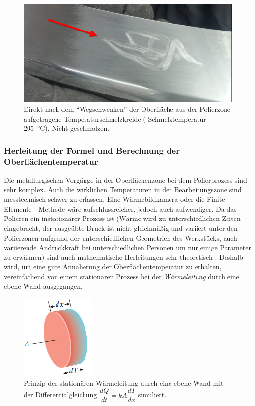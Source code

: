 \documentclass[12pt,a4paper,parskip,twoside,BCOR5mm,headsepline]{scrartcl}
\begin{document}
\begin{figure}[H]
\centering
\includegraphics[width=.8\textwidth]{Kreide}
\caption{Direkt nach dem "`Wegschwenken"' der Oberfläche aus der Polierzone aufgetragene Temperaturschmelzkreide ( Schmelztemperatur \SI{205}{\degreeCelsius}). Nicht geschmolzen.}
\label{kreide}
\end{figure}









\subsubsection{Herleitung der Formel und Berechnung der Oberflächentemperatur}
Die metallurgischen Vorgänge in der Oberflächenzone bei dem Polierprozess sind sehr komplex. Auch die wirklichen Temperaturen in der Bearbeitungszone sind messtechnisch schwer zu erfassen. Eine Wärmebildkamera oder die Finite - Elemente - Methode wäre aufschlussreicher, jedoch auch aufwendiger. Da das Polieren ein instationärer Prozess ist (Wärme wird zu unterschiedlichen Zeiten eingebracht, der ausgeübte Druck ist nicht gleichmäßig und variiert unter den Polierzonen aufgrund der unterschiedlichen Geometrien des Werkstücks, auch variierende Andruckkraft bei unterschiedlichen Personen um nur einige Parameter zu erwähnen) sind auch mathematische Herleitungen sehr theoretisch . Deshalb wird, um eine gute Annäherung der Oberflächentemperatur zu erhalten, vereinfachend von einem stationären Prozess bei der \emph{Wärmeleitung} durch eine ebene Wand ausgegangen.




\begin{figure}[H]
\centering
\includegraphics[width=.4\textwidth]{warmleittip}
\caption{Prinzip der stationären Wärmeleitung durch eine ebene Wand mit der Differentialgleichung $ \dfrac{dQ}{dt} = kA \dfrac{dT}{dx} $ simuliert.\\ \autocite[675]{phtip}}
\label{tipler}
\end{figure}  
\end{document}
